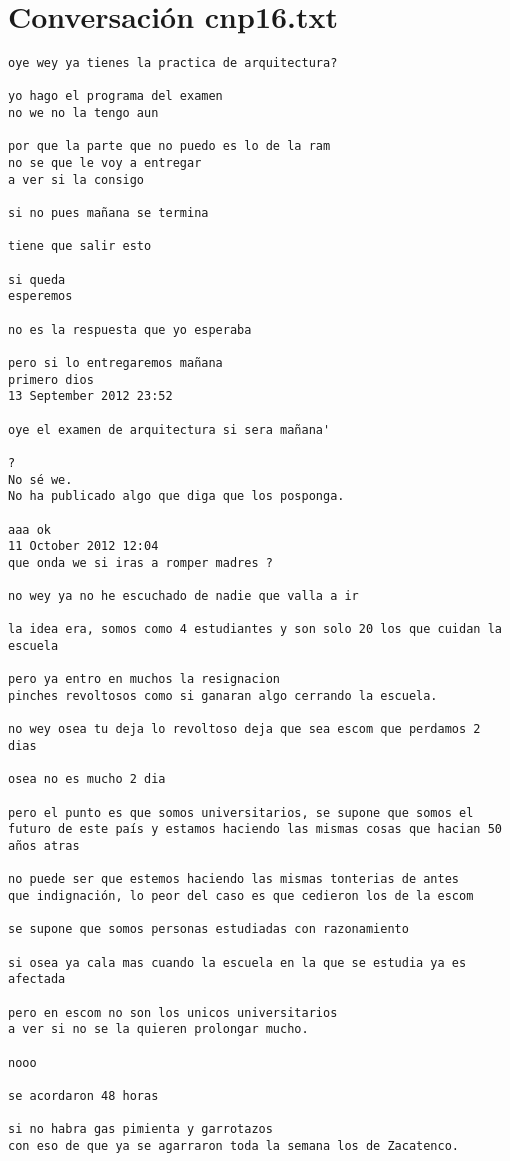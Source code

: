 \section{Conversaci\'on cnp16.txt}
\begin{verbatim}
oye wey ya tienes la practica de arquitectura?

yo hago el programa del examen
no we no la tengo aun

por que la parte que no puedo es lo de la ram
no se que le voy a entregar
a ver si la consigo

si no pues mañana se termina

tiene que salir esto

si queda
esperemos

no es la respuesta que yo esperaba

pero si lo entregaremos mañana
primero dios
13 September 2012 23:52

oye el examen de arquitectura si sera mañana'

?
No sé we.
No ha publicado algo que diga que los posponga.

aaa ok
11 October 2012 12:04
que onda we si iras a romper madres ?

no wey ya no he escuchado de nadie que valla a ir

la idea era, somos como 4 estudiantes y son solo 20 los que cuidan la escuela

pero ya entro en muchos la resignacion
pinches revoltosos como si ganaran algo cerrando la escuela.

no wey osea tu deja lo revoltoso deja que sea escom que perdamos 2 dias

osea no es mucho 2 dia

pero el punto es que somos universitarios, se supone que somos el futuro de este país y estamos haciendo las mismas cosas que hacian 50 años atras

no puede ser que estemos haciendo las mismas tonterias de antes
que indignación, lo peor del caso es que cedieron los de la escom

se supone que somos personas estudiadas con razonamiento

si osea ya cala mas cuando la escuela en la que se estudia ya es afectada

pero en escom no son los unicos universitarios
a ver si no se la quieren prolongar mucho.

nooo

se acordaron 48 horas

si no habra gas pimienta y garrotazos
con eso de que ya se agarraron toda la semana los de Zacatenco.


\end{verbatim}
